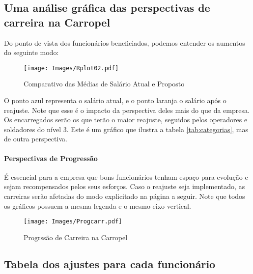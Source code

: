 \documentclass[a4paper, 12pt]{CSSullivanBusinessReport}
\begin{document}
\begin{fullwidth}
\subsection{Uma análise gráfica das perspectivas de carreira na Carropel}

Do ponto de vista dos funcionários beneficiados, podemos entender os aumentos do seguinte modo:


\begin{figure*}[H] 
	\texttt{[image: Images/Rplot02.pdf]}
	\caption{Comparativo das Médias de Salário Atual e Proposto}
	\label{fig:compasal} 
 \end{figure*}


\vspace{-0.7cm}
O ponto azul representa o salário atual, e o ponto laranja o salário após o reajuste. Note que esse é o impacto da perspectiva deles mais do que da empresa. Os encarregados serão os que terão o maior reajuste, seguidos pelos operadores e soldadores do nível 3. Este é um gráfico que ilustra a tabela \ref{tab:categorias}, mas de outra perspectiva. 

\paragraph{Perspectivas de Progressão} É essencial para a empresa que bons funcionários tenham espaço para evolução e sejam recompensados pelos seus esforços. Caso o reajuste seja implementado, as carreiras serão afetadas do modo explicitado na página a seguir. Note que todos os gráficos possuem a mesma legenda e o mesmo eixo vertical.


\begin{figure*}[H] 
	\texttt{[image: Images/Progcarr.pdf]}
	\caption{Progrssão de Carreira na Carropel}
	\label{fig:progcarr} 
 \end{figure*}
\vspace{-0.7cm}

\subsection{Tabela dos ajustes para cada funcionário}


\end{fullwidth}
\end{document}
